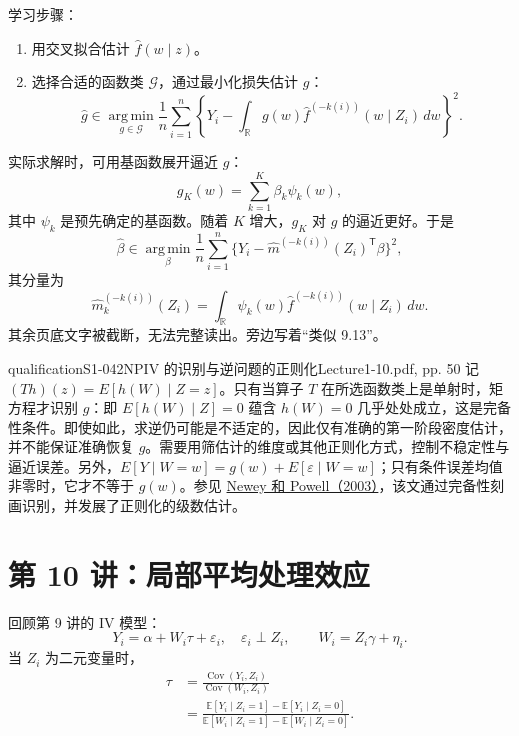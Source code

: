 学习步骤：
\begin{enumerate}
 \item 用交叉拟合估计 $\widehat f(w\mid z)$。
 \item 选择合适的函数类 $\mathcal G$，通过最小化损失估计 $g$：
 \[
 \widehat g\in\operatorname*{arg\,min}_{g\in\mathcal G}
 \frac1n\sum_{i=1}^n\left\{
 Y_i-\int_{\mathbb R}g(w)\widehat f^{(-k(i))}(w\mid Z_i)\,dw
 \right\}^{\!2}.\tag{9.16}
 \]
\end{enumerate}
实际求解时，可用基函数展开逼近 $g$：
\[
 g_K(w)=\sum_{k=1}^K\beta_k\psi_k(w),
\]
其中 $\psi_k$ 是预先确定的基函数。随着 $K$ 增大，$g_K$ 对 $g$ 的逼近更好。于是
\[
 \widehat\beta\in\operatorname*{arg\,min}_\beta
 \frac1n\sum_{i=1}^n
 \{Y_i-\widehat m^{(-k(i))}(Z_i)^{\mathsf T}\beta\}^2,\tag{9.17}
\]
其分量为
\[
 \widehat m_k^{(-k(i))}(Z_i)=
 \int_{\mathbb R}\psi_k(w)\widehat f^{(-k(i))}(w\mid Z_i)\,dw.
\]
其余页底文字被截断，无法完整读出。旁边写着“类似 9.13”。
\begin{reviewnote}{qualification}{S1-042}{NPIV 的识别与逆问题的正则化}{Lecture1-10.pdf, pp. 50}
记 $(Th)(z)=E[h(W)\mid Z=z]$。只有当算子 $T$ 在所选函数类上是单射时，矩方程才识别 $g$：即 $E[h(W)\mid Z]=0$ 蕴含 $h(W)=0$ 几乎处处成立，这是完备性条件。即使如此，求逆仍可能是不适定的，因此仅有准确的第一阶段密度估计，并不能保证准确恢复 $g$。需要用筛估计的维度或其他正则化方式，控制不稳定性与逼近误差。另外，$E[Y\mid W=w]=g(w)+E[\varepsilon\mid W=w]$；只有条件误差均值非零时，它才不等于 $g(w)$。参见 \href{https://doi.org/10.1111/1468-0262.00459}{Newey 和 Powell（2003）}，该文通过完备性刻画识别，并发展了正则化的级数估计。
\end{reviewnote}


\section{第 10 讲：局部平均处理效应}
回顾第 9 讲的 IV 模型：
\[
 Y_i=\alpha+W_i\tau+\varepsilon_i,\quad\varepsilon_i\perp Z_i,
 \qquad W_i=Z_i\gamma+\eta_i.\tag{10.1}
\]
当 $Z_i$ 为二元变量时，
\begin{align*}
 \tau&=\frac{\operatorname{Cov}(Y_i,Z_i)}{\operatorname{Cov}(W_i,Z_i)}\\
 &=\frac{\mathbb E[Y_i\mid Z_i=1]-\mathbb E[Y_i\mid Z_i=0]}
 {\mathbb E[W_i\mid Z_i=1]-\mathbb E[W_i\mid Z_i=0]}.\tag{10.2}
\end{align*}

